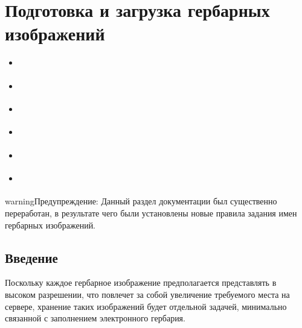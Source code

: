 \documentclass[letterpaper,10pt,russian]{sphinxmanual}
\begin{document}
\chapter{Подготовка и загрузка гербарных изображений}
\label{\detokenize{scanning::doc}}\label{\detokenize{scanning:id1}}
\begin{sphinxShadowBox}
\begin{itemize}
\item {} 
\label{\detokenize{scanning:id16}}{\hyperref[\detokenize{scanning:id3}]{}}

\item {} 
\label{\detokenize{scanning:id17}}{\hyperref[\detokenize{scanning:index-1}]{}}

\item {} 
\label{\detokenize{scanning:id18}}{\hyperref[\detokenize{scanning:id6}]{}}

\item {} 
\label{\detokenize{scanning:id19}}{\hyperref[\detokenize{scanning:id7}]{}}

\item {} 
\label{\detokenize{scanning:id20}}{\hyperref[\detokenize{scanning:index-2}]{}}

\item {} 
\label{\detokenize{scanning:id21}}{\hyperref[\detokenize{scanning:id10}]{}}

\end{itemize}
\end{sphinxShadowBox}

\ignorespaces 
\begin{sphinxadmonition}{warning}{Предупреждение:}
Данный раздел документации был существенно переработан, в результате чего были
установлены новые правила  задания имен гербарных изображений.
\end{sphinxadmonition}


\section{Введение}
\label{\detokenize{scanning:id3}}
Поскольку каждое гербарное изображение предполагается представлять в высоком разрешении,
что повлечет за собой увеличение требуемого места на сервере, хранение таких изображений
будет отдельной задачей, минимально связанной с заполнением электронного гербария.
\end{document}

